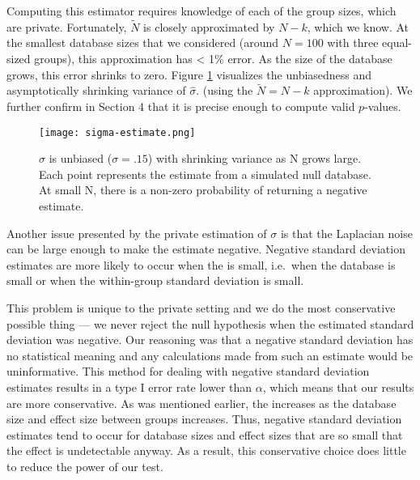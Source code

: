 Computing this estimator requires knowledge of each of the group sizes, which are private. Fortunately, $\tilde{N}$ is closely approximated by $N-k$, which we know. At the smallest database sizes that we considered (around $N = 100$ with three equal-sized groups), this approximation has < 1\% error. As the size of the database grows, this error shrinks to zero.  Figure \ref{fig:sigma-estimate} visualizes the unbiasedness and asymptotically shrinking variance of $\hat{\sigma}$. (using the $\tilde{N} = N-k$ approximation).  We further confirm in Section 4 that it is precise enough to compute valid $p$-values. 


\begin{figure}
\centering
\texttt{[image: sigma-estimate.png]}
\caption{$\hat{\sigma}$ is unbiased ($\sigma = .15$) with shrinking variance as N grows large. Each point represents the estimate from a simulated null database. At small N, there is a non-zero probability of returning a negative estimate.\label{fig:sigma-estimate}}
\end{figure}

Another issue presented by the private estimation of $\sigma$ is that the Laplacian noise can be large enough to make the estimate negative. Negative standard deviation estimates are more likely to occur when the \se is small, i.e.~when the database is small or when the within-group standard deviation is small.

This problem is unique to the private setting and we do the most conservative possible thing --- we never reject the null hypothesis when the estimated standard deviation was negative. Our reasoning was that a negative standard deviation has no statistical meaning and any calculations made from such an estimate would be uninformative.  This method for dealing with negative standard deviation estimates results in a type I error rate lower than $\alpha$, which means that our results are more conservative. As was mentioned earlier, the \sa increases as the database size and effect size between groups increases. Thus, negative standard deviation estimates tend to occur for database sizes and effect sizes that are so small that the effect is undetectable anyway.  As a result, this conservative choice does little to reduce the power of our test.

